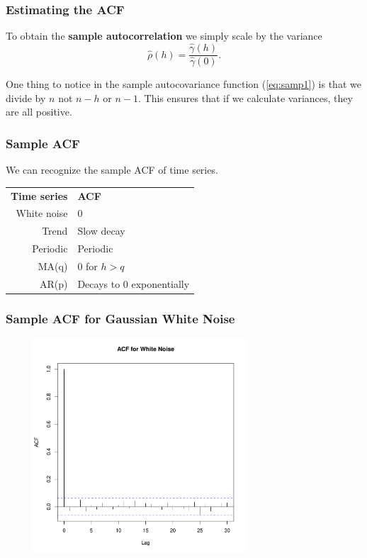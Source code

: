 \documentclass[%
xcolor=pdftex]{beamer}
\begin{document}
\begin{frame}
\frametitle{Estimating the ACF}

To obtain the \textbf{sample autocorrelation} we simply scale by the variance
\begin{equation} \label{eq:samp2}
\hat{\rho}(h)=\frac{\hat{\gamma}(h)}{{\hat{\gamma}(0)}}.
\end{equation}

One thing to notice in the sample autocovariance function (\ref{eq:samp1}) is that we divide by $n$ not $n-h$ or $n-1$.  This ensures that if we calculate variances, they are all positive.

\end{frame}


\begin{frame}
\frametitle{Sample ACF}

We can recognize the sample ACF of time series.\\

\begin{center}
\begin{tabular}{ r l }
  \textbf{Time series} & \textbf{ACF} \\
White noise & 0\\
Trend & Slow decay\\
Periodic & Periodic\\
MA(q) & 0 for $h>q$\\
AR(p) & Decays to 0 exponentially\\
\end{tabular}
\end{center}

\end{frame}

\begin{frame}
\frametitle{Sample ACF for Gaussian White Noise}

\includegraphics[width=100mm, height=80mm]{pics/acf_wn.pdf}

\end{frame}
\end{document}
